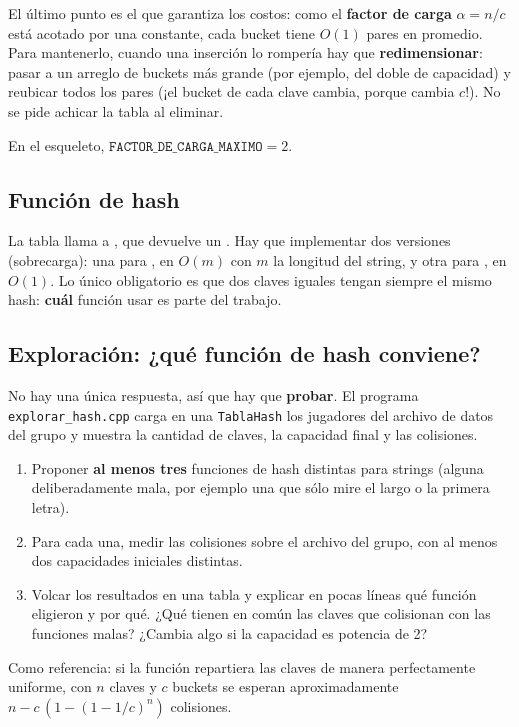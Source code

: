 \documentclass{article}
\begin{document}
El último punto es el que garantiza los costos: como el \textbf{factor
de carga} $\alpha = n / c$ está acotado por una constante, cada bucket
tiene $O(1)$ pares en promedio. Para mantenerlo, cuando una inserción lo
rompería hay que \textbf{redimensionar}: pasar a un arreglo de buckets
más grande (por ejemplo, del doble de capacidad) y reubicar todos los
pares (¡el bucket de cada clave cambia, porque cambia $c$!). No se pide
achicar la tabla al eliminar.

En el esqueleto, $\texttt{FACTOR\_DE\_CARGA\_MAXIMO} = 2$.

\subsection{Función de hash}

La tabla llama a , que devuelve un
. Hay que implementar dos versiones (sobrecarga): una
para , en $O(m)$ con $m$ la longitud del string, y
otra para , en $O(1)$. Lo único obligatorio es que dos
claves iguales tengan siempre el mismo hash: \textbf{cuál} función usar
es parte del trabajo.

\subsection{Exploración: ¿qué función de hash conviene?}

No hay una única respuesta, así que hay que \textbf{probar}. El
programa \texttt{explorar\_hash.cpp} carga en una \texttt{TablaHash}
los jugadores del archivo de datos del grupo y muestra la cantidad de
claves, la capacidad final y las colisiones.

\begin{enumerate}
\item Proponer \textbf{al menos tres} funciones de hash distintas para
  strings (alguna deliberadamente mala, por ejemplo una que sólo mire el
  largo o la primera letra).
\item Para cada una, medir las colisiones sobre el archivo del grupo,
  con al menos dos capacidades iniciales distintas.
\item Volcar los resultados en una tabla y explicar en pocas líneas qué
  función eligieron y por qué. ¿Qué tienen en común las claves que
  colisionan con las funciones malas? ¿Cambia algo si la capacidad es
  potencia de 2?
\end{enumerate}

Como referencia: si la función repartiera las claves de manera
perfectamente uniforme, con $n$ claves y $c$ buckets se esperan
aproximadamente $n - c\,(1 - (1 - 1/c)^n)$ colisiones.
\end{document}
